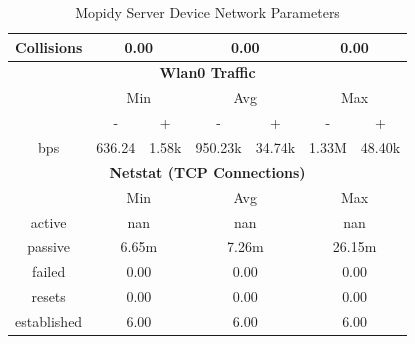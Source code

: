 \documentclass[11pt,a4paper,headinclude=false,footinclude=false]{scrreprt}
\begin{document}
\begin{table}[H]
\begin{tabular}{||c|c|c|c|c|c|c||}
    \hline
    Collisions & \multicolumn{2}{|c|}{0.00} & \multicolumn{2}{|c|}{0.00} & \multicolumn{2}{|c|}{0.00} \\
    \hline\hline
    \multicolumn{7}{|c|}{\textbf{Wlan0 Traffic}} \\
    \hline\hline
      & \multicolumn{2}{|c|}{Min} & \multicolumn{2}{|c|}{Avg} & \multicolumn{2}{|c|}{Max} \\
    \hline
      & - & + & - & + & - & + \\
    \hline
    bps  & 636.24 & 1.58k & 950.23k & 34.74k & 1.33M & 48.40k \\
    \hline\hline
    \multicolumn{7}{|c|}{\textbf{Netstat (TCP Connections)}} \\
    \hline\hline
      & \multicolumn{2}{|c|}{Min} & \multicolumn{2}{|c|}{Avg} & \multicolumn{2}{|c|}{Max} \\
    \hline
    active & \multicolumn{2}{|c|}{nan} & \multicolumn{2}{|c|}{nan} & \multicolumn{2}{|c|}{nan} \\
    \hline
    passive & \multicolumn{2}{|c|}{6.65m} & \multicolumn{2}{|c|}{7.26m} & \multicolumn{2}{|c|}{26.15m} \\
    \hline
    failed & \multicolumn{2}{|c|}{0.00} & \multicolumn{2}{|c|}{0.00} & \multicolumn{2}{|c|}{0.00} \\
    \hline
    resets & \multicolumn{2}{|c|}{0.00} & \multicolumn{2}{|c|}{0.00} & \multicolumn{2}{|c|}{0.00} \\
    \hline
    established & \multicolumn{2}{|c|}{6.00} & \multicolumn{2}{|c|}{6.00} & \multicolumn{2}{|c|}{6.00} \\
    \hline\hline
    \end{tabular}
    \caption{Mopidy Server Device Network Parameters}
    \label{MopidyserverNetTab}
\end{table}
\end{document}
